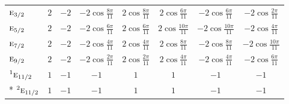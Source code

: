 \documentclass[10pt,a4paper]{article}
\numberwithin{equation}{section}
\newcommand{\irr}[1]{\text{\normalfont\scshape #1}}
\newcommand{\conjpair}[1]{{}^{#1}}
\begin{document}
{{\begin{longtable}{@{}lccccccc@{}}
$\irr{e}_{3/2}$ & $2$ & $-2$ & $-2\cos\tfrac{8\pi}{11}$ & $2\cos\tfrac{8\pi}{11}$ & $2\cos\tfrac{6\pi}{11}$ & $-2\cos\tfrac{6\pi}{11}$ & $-2\cos\tfrac{2\pi}{11}$\\
$\irr{e}_{5/2}$ & $2$ & $-2$ & $-2\cos\tfrac{6\pi}{11}$ & $2\cos\tfrac{6\pi}{11}$ & $2\cos\tfrac{10\pi}{11}$ & $-2\cos\tfrac{10\pi}{11}$ & $-2\cos\tfrac{4\pi}{11}$\\
$\irr{e}_{7/2}$ & $2$ & $-2$ & $-2\cos\tfrac{4\pi}{11}$ & $2\cos\tfrac{4\pi}{11}$ & $2\cos\tfrac{8\pi}{11}$ & $-2\cos\tfrac{8\pi}{11}$ & $-2\cos\tfrac{10\pi}{11}$\\
$\irr{e}_{9/2}$ & $2$ & $-2$ & $-2\cos\tfrac{2\pi}{11}$ & $2\cos\tfrac{2\pi}{11}$ & $2\cos\tfrac{4\pi}{11}$ & $-2\cos\tfrac{4\pi}{11}$ & $-2\cos\tfrac{6\pi}{11}$\\
$\conjpair{1}\irr{e}_{11/2}$ & $1$ & $-1$ & $-1$ & $1$ & $1$ & $-1$ & $-1$\\*
$\conjpair{2}\irr{e}_{11/2}$ & $1$ & $-1$ & $-1$ & $1$ & $1$ & $-1$ & $-1$\\
\bottomrule\end{longtable}}}
\end{document}
